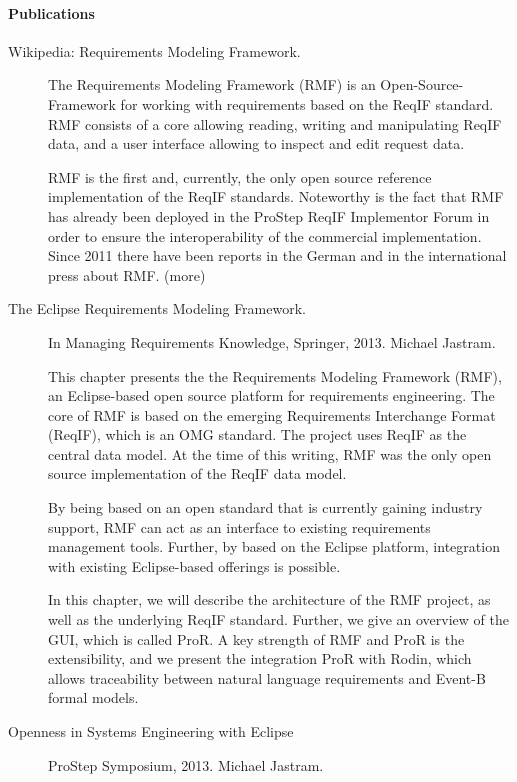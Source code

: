 \paragraph{Publications}

\begin{description}

\item[Wikipedia: Requirements Modeling Framework.]  The Requirements Modeling Framework (RMF) is an Open-Source-Framework for working with requirements based on the ReqIF standard. RMF consists of a core allowing reading, writing and manipulating ReqIF data, and a user interface allowing to inspect and edit request data.

RMF is the first and, currently, the only open source reference implementation of the ReqIF standards. Noteworthy is the fact that RMF has already been deployed in the ProStep ReqIF Implementor Forum in order to ensure the interoperability of the commercial implementation. Since 2011 there have been reports in the German and in the international press about RMF. (more)

\item[The Eclipse Requirements Modeling Framework.] In Managing Requirements Knowledge, Springer, 2013. Michael Jastram.

 This chapter presents the the Requirements Modeling Framework (RMF), an Eclipse-based open source platform for requirements engineering. The core of RMF is based on the emerging Requirements Interchange Format (ReqIF), which is an OMG standard. The project uses ReqIF as the central data model. At the time of this writing, RMF was the only open source implementation of the ReqIF data model.

By being based on an open standard that is currently gaining industry support, RMF can act as an interface to existing requirements management tools. Further, by based on the Eclipse platform, integration with existing Eclipse-based offerings is possible.

In this chapter, we will describe the architecture of the RMF project, as well as the underlying ReqIF standard. Further, we give an overview of the GUI, which is called ProR. A key strength of RMF and ProR is the extensibility, and we present the integration ProR with Rodin, which allows traceability between natural language requirements and Event-B formal models. 

\item[Openness in Systems Engineering with Eclipse] ProStep Symposium, 2013. Michael Jastram.


\end{description}
